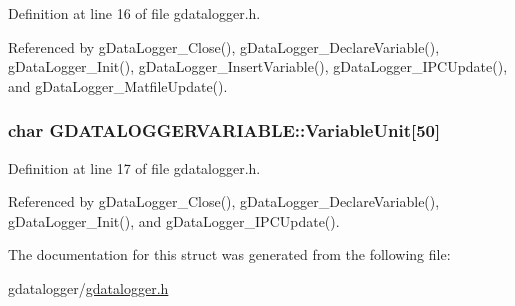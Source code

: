 Definition at line 16 of file gdatalogger.h.



Referenced by gDataLogger\_\-Close(), gDataLogger\_\-DeclareVariable(), gDataLogger\_\-Init(), gDataLogger\_\-InsertVariable(), gDataLogger\_\-IPCUpdate(), and gDataLogger\_\-MatfileUpdate().

\hypertarget{structGDATALOGGERVARIABLE_a0d42da63f3f904774cbf2ee8d92ee135}{
\subsubsection[{VariableUnit}]{\setlength{\rightskip}{0pt plus 5cm}char {\bf GDATALOGGERVARIABLE::VariableUnit}\mbox{[}50\mbox{]}}}
\label{structGDATALOGGERVARIABLE_a0d42da63f3f904774cbf2ee8d92ee135}


Definition at line 17 of file gdatalogger.h.



Referenced by gDataLogger\_\-Close(), gDataLogger\_\-DeclareVariable(), gDataLogger\_\-Init(), and gDataLogger\_\-IPCUpdate().



The documentation for this struct was generated from the following file:\begin{DoxyCompactItemize}
\item 
gdatalogger/\hyperlink{gdatalogger_8h}{gdatalogger.h}\end{DoxyCompactItemize}
